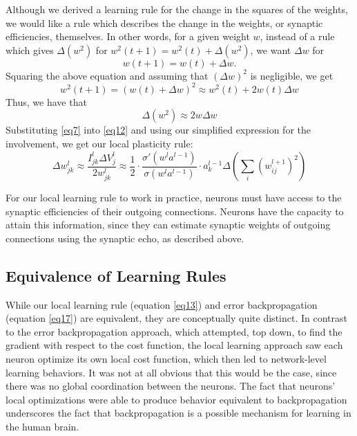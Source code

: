 \documentclass[12pt]{article}
\begin{document}
Although we derived a learning rule for the change in the squares of the weights, we would like a rule which describes the change in the weights, or synaptic efficiencies, themselves. In other words, for a given weight $w$, instead of a rule which gives $\Delta(w^2)$ for $w^2(t+1) = w^2(t) + \Delta(w^2)$, we want $\Delta w$ for
\begin{equation}
	w(t+1) = w(t) + \Delta w.
\end{equation}
Squaring the above equation and assuming that $(\Delta w)^2$ is negligible, we get
\begin{equation}
	w^2(t+1) = (w(t) + \Delta w)^2 \approx w^2(t) + 2w(t)\Delta w
\end{equation}
Thus, we have that
\begin{equation}
	\Delta (w^2) \approx 2w\Delta w\label{eq12}
\end{equation}
Substituting \ref{eq7} into \ref{eq12} and using our simplified expression for the involvement, we get our local plasticity rule:
\begin{equation}
	\Delta w_{jk}^l\approx \frac{I_{jk}^l \Delta V_j^l}{2w_{jk}^l}\approx\frac{1}{2}\cdot\frac{\sigma'\left(w^l a^{l-1}\right)}{\sigma\left(w^l a^{l-1}\right)}\cdot a_k^{l-1}\Delta \left(\sum_i \left(w_{ij}^{l+1}\right)^2\right)\label{eq13}
\end{equation}

For our local learning rule to work in practice, neurons must have access to the synaptic efficiencies of their outgoing connections. Neurons have the capacity to attain this information, since they can estimate synaptic weights of outgoing connections using the synaptic echo, as described above.

\subsection{Equivalence of Learning Rules}
While our local learning rule (equation \ref{eq13}) and error backpropagation (equation \ref{eq17}) are equivalent, they are conceptually quite distinct. In contrast to the error backpropagation approach, which attempted, top down, to find the gradient with respect to the cost function, the local learning approach saw each neuron optimize its own local cost function, which then led to network-level learning behaviors. It was not at all obvious that this would be the case, since there was no global coordination between the neurons. The fact that neurons' local optimizations were able to produce behavior equivalent to backpropagation underscores the fact that backpropagation is a possible mechanism for learning in the human brain.
\end{document}
